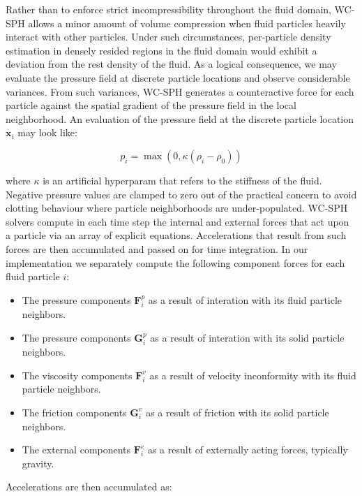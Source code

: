 \documentclass[
	11pt, 
	DIV10,
	ngerman,
	a4paper, 
	oneside, 
	headings=normal, 
	captions=tableheading,
	final, 
	numbers=noenddot
]{scrartcl}
\begin{document}
Rather than to enforce strict incompressibility throughout the fluid domain, WC-SPH allows a minor amount of volume compression when fluid particles heavily interact with other particles. Under such circumstances, per-particle density estimation in densely resided regions in the fluid domain would exhibit a deviation from the rest density of the fluid. As a logical consequence, we may evaluate the pressure field at discrete particle locations and observe considerable variances. From such variances, WC-SPH generates a counteractive force for each particle against the spatial gradient of the pressure field in the local neighborhood. An evaluation of the pressure field at the discrete particle location $ \boldsymbol{x}_{i} $ may look like:

\begin{equation}
	\label{eq15}
    p_{i} = \max(0, \kappa(\rho_{i} - \rho_{0}))
\end{equation}

where $ \kappa $ is an artificial hyperparam that refers to the stiffness of the fluid. Negative pressure values are clamped to zero out of the practical concern to avoid clotting behaviour where particle neighborhoods are under-populated. WC-SPH solvers compute in each time step the internal and external forces that act upon a particle via an array of explicit equations. Accelerations that result from such forces are then accumulated and passed on for time integration. In our implementation we separately compute the following component forces for each fluid particle $ i $:

\begin{itemize}
    \item The pressure components $ \mathbf{F}_{i}^{p} $ as a result of interation with its fluid particle neighbors.
    \item The pressure components $ \mathbf{G}_{i}^{p} $ as a result of interation with its solid particle neighbors.
    \item The viscosity components $ \mathbf{F}_{i}^{v} $ as a result of velocity inconformity with its fluid particle neighbors.
    \item The friction components $ \mathbf{G}_{i}^{v} $ as a result of friction with its solid particle neighbors.
    \item The external components $ \mathbf{F}_{i}^{e} $ as a result of externally acting forces, typically gravity.
\end{itemize}

Accelerations are then accumulated as:
\end{document}
